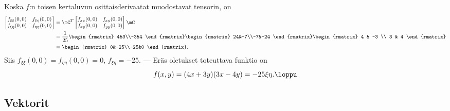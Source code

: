Koska $f$:n toisen kertaluvun osittaisderivaatat muodostavat tensorin, on
\begin{align*}
\begin{bmatrix} 
f_{\xi\xi}(0,0) & f_{\xi\eta}(0,0) \\ f_{\xi\eta}(0,0) & f_{\eta\eta}(0,0) 
\end{bmatrix}
&=\mC^T\begin{bmatrix} f_{xx}(0,0)&f_{xy}(0,0) \\ f_{xy}(0,0)&f_{yy}(0,0) \end{bmatrix}\mC \\
&=\frac{1}{25}\begin{rmatrix} 4&3\\-3&4 \end{rmatrix} 
              \begin{rmatrix} 24&-7\\-7&-24 \end{rmatrix}
              \begin{rmatrix} 4 & -3 \\ 3 & 4 \end{rmatrix} \\
&=\begin{rmatrix} 0&-25\\-25&0 \end{rmatrix}.
\end{align*}
Siis $f_{\xi\xi}(0,0)=f_{\eta\eta}(0,0)=0$, $f_{\xi\eta}=-25$. --- Eräs oletukset toteuttava 
funktio on
\[
f(x,y)=(4x+3y)(3x-4y)=-25\xi\eta. \loppu
\]

\subsection*{Vektorit}

